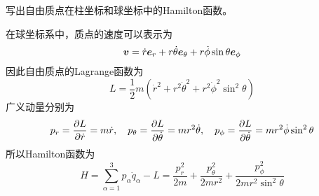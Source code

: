 \begin{question}
写出自由质点在柱坐标和球坐标中的Hamilton函数。
\end{question}
\begin{solution}
在球坐标系中，质点的速度可以表示为
\begin{equation*}
	\boldsymbol{v} = \dot{r} \boldsymbol{e}_r + r\dot{\theta} \boldsymbol{e}_\theta + r \dot{\phi} \sin \theta \boldsymbol{e}_\phi
\end{equation*}
因此自由质点的Lagrange函数为
\begin{equation*}
	L = \frac12 m(\dot{r}^2 + r^2 \dot{\theta}^2 + r^2 \dot{\phi}^2 \sin^2 \theta)
\end{equation*}
广义动量分别为
\begin{equation*}
	p_r = \frac{\partial L}{\partial \dot{r}} = m\dot{r},\quad p_\theta = \frac{\partial L}{\partial \dot{\theta}} = mr^2 \dot{\theta},\quad p_\phi = \frac{\partial L}{\partial \dot{\theta}} = mr^2 \dot{\phi} \sin^2 \theta
\end{equation*}
所以Hamilton函数为
\begin{equation*}
	H = \sum_{\alpha=1}^3 p_\alpha \dot{q}_\alpha - L = \frac{p_r^2}{2m} + \frac{p_\theta^2}{2mr^2} + \frac{p_\phi^2}{2mr^2\sin^2 \theta}
\end{equation*}
\end{solution}

